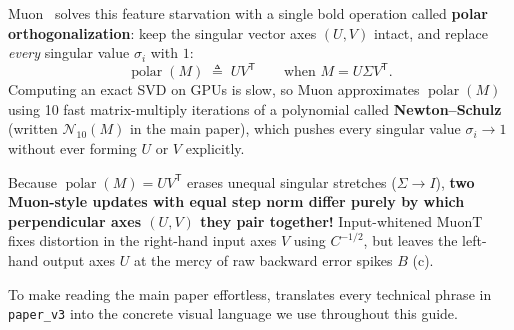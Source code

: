 \documentclass[11pt]{article}
\newcommand{\Tr}{{\mathsf{T}}}
\newcommand{\Nten}{\mathcal{N}_{10}}
\newcommand{\polar}{\operatorname{polar}}
\newcommand{\mname}[1]{#1}
\begin{document}
\mname{Muon}~\citep{jordan2024muon} solves this feature starvation with a single bold operation called \textbf{polar orthogonalization}: keep the singular vector axes $(U, V)$ intact, and replace \emph{every} singular value $\sigma_i$ with $1$:
\begin{equation}
  \polar(M) \;\triangleq\; U V^{\Tr} \qquad \text{when } M = U \Sigma V^{\Tr}.
  \label{eq:polar_def}
\end{equation}
Computing an exact SVD on GPUs is slow, so \mname{Muon} approximates $\polar(M)$ using 10 fast matrix-multiply iterations of a polynomial called \textbf{Newton--Schulz} (written $\Nten(M)$ in the main paper), which pushes every singular value $\sigma_i \to 1$ without ever forming $U$ or $V$ explicitly.

\begin{keyfinding}
Because $\polar(M) = U V^{\Tr}$ erases unequal singular stretches ($\Sigma \to I$), \textbf{two \mname{Muon}-style updates with equal step norm differ purely by which perpendicular axes $(U, V)$ they pair together!}
Input-whitened \mname{MuonT}~\citep{mohamadi2026toner} fixes distortion in the right-hand input axes $V$ using $C^{-1/2}$, but leaves the left-hand output axes $U$ at the mercy of raw backward error spikes $B$ (c).
\end{keyfinding}

To make reading the main paper effortless,  translates every technical phrase in \texttt{paper\_v3} into the concrete visual language we use throughout this guide.
\end{document}
